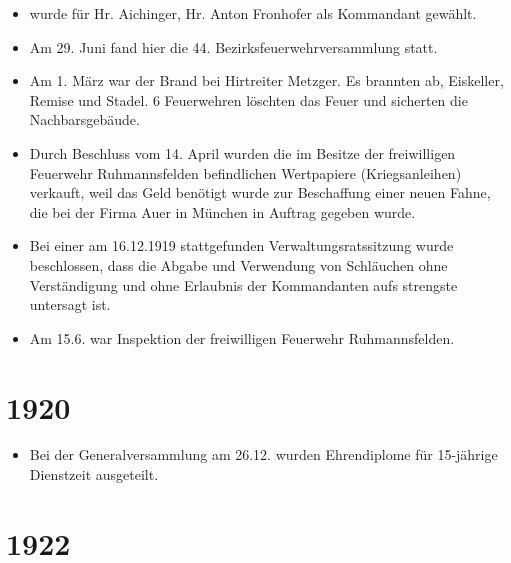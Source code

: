\documentclass[12pt,a4paper]{book}
\begin{document}
\begin{itemize}
\item wurde für Hr. Aichinger, Hr. Anton Fronhofer als Kommandant
gewählt.

\item Am 29. Juni fand hier die 44. Bezirksfeuerwehrversammlung statt.

\item Am 1. März war der Brand bei Hirtreiter Metzger. Es brannten ab,
Eiskeller, Remise und Stadel. 6 Feuerwehren löschten das Feuer und
sicherten die Nachbarsgebäude.

\item Durch Beschluss vom 14. April wurden die im Besitze der
freiwilligen Feuerwehr Ruhmannsfelden befindlichen Wertpapiere
(Kriegsanleihen) verkauft, weil das Geld benötigt wurde zur Beschaffung
einer neuen Fahne, die bei der Firma Auer in München in Auftrag gegeben
wurde.

\item Bei einer am 16.12.1919 stattgefunden Verwaltungsratssitzung wurde
beschlossen, dass die Abgabe und Verwendung von Schläuchen ohne
Verständigung und ohne Erlaubnis der Kommandanten aufs strengste
untersagt ist.

\item Am 15.6. war Inspektion der freiwilligen Feuerwehr Ruhmannsfelden.
\end{itemize}

\section*{1920}

\begin{itemize}
\item Bei der Generalversammlung am 26.12. wurden Ehrendiplome für
15-jährige Dienstzeit ausgeteilt.
\end{itemize}

\section*{1922}
\end{document}
